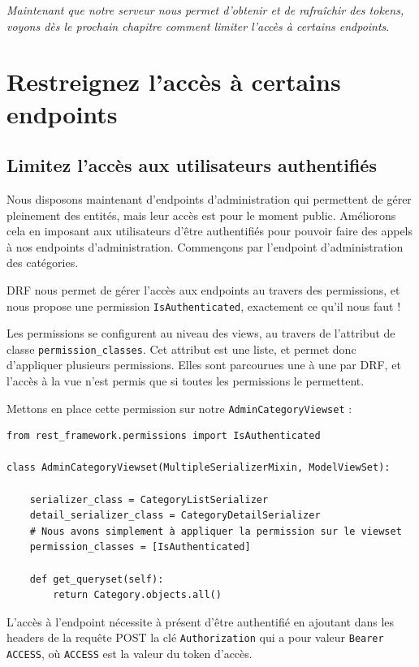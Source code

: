\documentclass[a4paper]{article}
\begin{document}
 {\em Maintenant que notre serveur nous permet d’obtenir et de rafraîchir des tokens, voyons dès le prochain chapitre comment limiter l’accès à certains endpoints}.

\section{Restreignez l'accès à certains endpoints}
\subsection{Limitez l’accès aux utilisateurs authentifiés}
Nous disposons maintenant d’endpoints d’administration qui permettent de gérer pleinement des entités, mais leur accès est pour le moment {\color{monOrange}public}. Améliorons cela en imposant aux utilisateurs d’être authentifiés pour pouvoir faire des appels à nos endpoints d’administration. Commençons par l'endpoint d’{\color{monOrange}administration des catégories}.

DRF nous permet de {\color{monOrange}gérer l’accès aux endpoints} au travers des permissions, et nous propose une permission {\tt IsAuthenticated}, exactement ce qu’il nous faut !

Les permissions se configurent au niveau des views, au travers de l’attribut de classe {\tt permission\_classes}. Cet attribut est une liste, et permet donc d’appliquer plusieurs permissions. Elles sont parcourues une à une par DRF, et l’accès à la vue n’est permis que si toutes les permissions le permettent.

Mettons en place cette permission sur notre {\tt AdminCategoryViewset}  :
\begin{verbatim}
from rest_framework.permissions import IsAuthenticated
 
class AdminCategoryViewset(MultipleSerializerMixin, ModelViewSet):
 
    serializer_class = CategoryListSerializer
    detail_serializer_class = CategoryDetailSerializer
    # Nous avons simplement à appliquer la permission sur le viewset
    permission_classes = [IsAuthenticated]
 
    def get_queryset(self):
        return Category.objects.all()
\end{verbatim}

L’accès à l'endpoint nécessite à présent d’être authentifié en ajoutant dans les headers de la requête POST la clé {\tt Authorization}  qui a pour valeur  {\tt Bearer ACCESS}, où {\tt ACCESS}  est la valeur du token d’accès.
\end{document}

